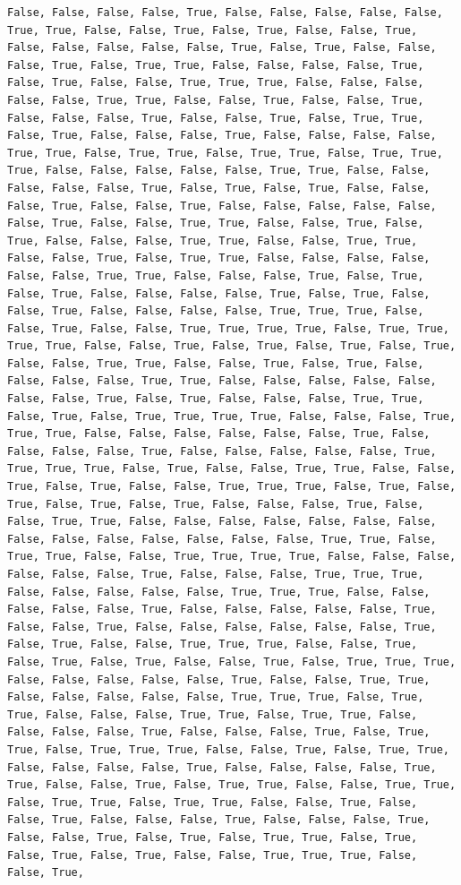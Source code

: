 \documentclass[
  letterpaper,
  DIV=11,
  numbers=noendperiod]{scrartcl}
\begin{document}
\begin{verbatim}
False, False, False, False, True, False, False, False, False, False, True, True, False, False, True, False, True, False, False, True, False, False, False, False, False, True, False, True, False, False, False, True, False, True, True, False, False, False, False, True, False, True, False, False, True, True, True, False, False, False, False, False, True, True, False, False, True, False, False, True, False, False, False, True, False, False, True, False, True, True, False, True, False, False, False, True, False, False, False, False, True, True, False, True, True, False, True, True, False, True, True, True, False, False, False, False, False, True, True, False, False, False, False, False, True, False, True, False, True, False, False, False, True, False, False, True, False, False, False, False, False, False, True, False, False, True, True, False, False, True, False, True, False, False, False, True, True, False, False, True, True, False, False, True, False, True, True, False, False, False, False, False, False, True, True, False, False, False, True, False, True, False, True, False, False, False, False, True, False, True, False, False, True, False, False, False, False, True, True, True, False, False, True, False, False, True, True, True, True, False, True, True, True, True, False, False, True, False, True, False, True, False, True, False, False, True, True, False, False, True, False, True, False, False, False, False, True, True, False, False, False, False, False, False, False, True, False, True, False, False, False, True, True, False, True, False, True, True, True, True, False, False, False, True, True, True, False, False, False, False, False, False, True, False, False, False, False, True, False, False, False, False, False, True, True, True, True, False, True, False, False, True, True, False, False, True, False, True, False, False, True, True, True, False, True, False, True, False, True, False, True, False, False, False, True, False, False, True, True, False, False, False, False, False, False, False, False, False, False, False, False, False, False, True, True, False, True, True, False, False, True, True, True, True, False, False, False, False, False, False, True, False, False, False, True, True, True, False, False, False, False, False, True, True, True, False, False, False, False, False, True, False, False, False, False, False, True, False, False, True, False, False, False, False, False, False, True, False, True, False, False, True, True, True, False, False, True, False, True, False, True, False, False, True, False, True, True, True, False, False, False, False, False, True, False, False, True, True, False, False, False, False, False, True, True, True, False, True, True, False, False, False, True, True, False, True, True, False, False, False, False, True, False, False, False, True, False, True, True, False, True, True, True, False, False, True, False, True, True, False, False, False, False, True, False, False, False, False, True, True, False, False, True, False, True, True, False, False, True, True, False, True, True, False, True, True, False, False, True, False, False, True, False, False, False, True, False, False, False, True, False, False, True, False, True, False, True, True, False, True, False, True, False, True, False, False, True, True, True, False, False, True, 
\end{verbatim}
\end{document}
